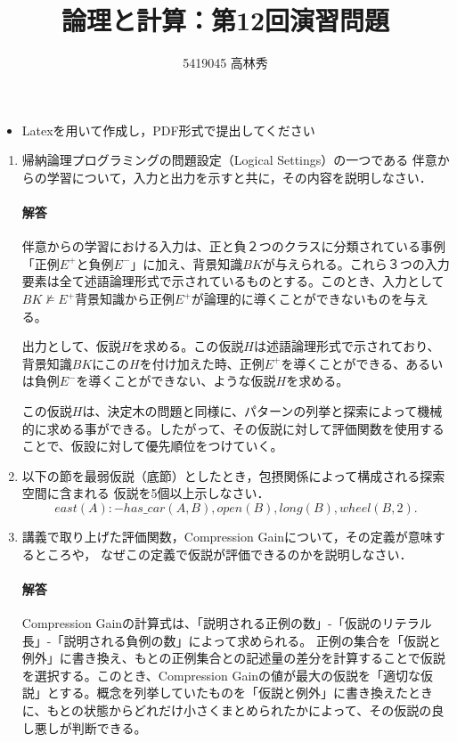 \documentclass[dvipdfmx]{jsarticle}
\def\NO{12}
\def\LECTURENAME{論理と計算}
\begin{document}
\title{\LECTURENAME{}：第\NO{}回演習問題}

\author{5419045 高林秀}

\date{}
\maketitle

\begin{itemize}
\item Latexを用いて作成し，PDF形式で提出してください
\end{itemize}


\vspace*{\baselineskip}

\begin{enumerate}\setlength{\itemsep}{\baselineskip}

\item 帰納論理プログラミングの問題設定（Logical Settings）の一つである
  伴意からの学習について，入力と出力を示すと共に，その内容を説明しなさい．
  \paragraph{解答}
  伴意からの学習における入力は、正と負２つのクラスに分類されている事例「正例$E^{+}$と負例$E^{-}$」に加え、背景知識$BK$が与えられる。これら３つの入力要素は全て述語論理形式で示されているものとする。このとき、入力として$BK \nvDash E^{+}$背景知識から正例$E^{+}$が論理的に導くことができないものを与える。\par
  出力として、仮説$H$を求める。この仮説$H$は述語論理形式で示されており、背景知識$BK$にこの$H$を付け加えた時、正例$E^{+}$を導くことができる、あるいは負例$E^{-}$を導くことができない、ような仮説$H$を求める。\par
  この仮説$H$は、決定木の問題と同様に、パターンの列挙と探索によって機械的に求める事ができる。したがって、その仮説に対して評価関数を使用することで、仮設に対して優先順位をつけていく。


\item
  以下の節を最弱仮説（底節）としたとき，包摂関係によって構成される探索空間に含まれる
  仮説を5個以上示しなさい．
  \[
  east(A):- has\_car(A, B), open(B), long(B), wheel(B,2).
  \]

\item
  講義で取り上げた評価関数，Compression Gainについて，その定義が意味するところや，
  なぜこの定義で仮説が評価できるのかを説明しなさい．
  \paragraph{解答}
  Compression Gainの計算式は、「説明される正例の数」-「仮説のリテラル長」-「説明される負例の数」によって求められる。
  正例の集合を「仮説と例外」に書き換え、もとの正例集合との記述量の差分を計算することで仮説を選択する。このとき、Compression Gainの値が最大の仮説を「適切な仮説」とする。概念を列挙していたものを「仮説と例外」に書き換えたときに、もとの状態からどれだけ小さくまとめられたかによって、その仮説の良し悪しが判断できる。


\end{enumerate}
\end{document}

